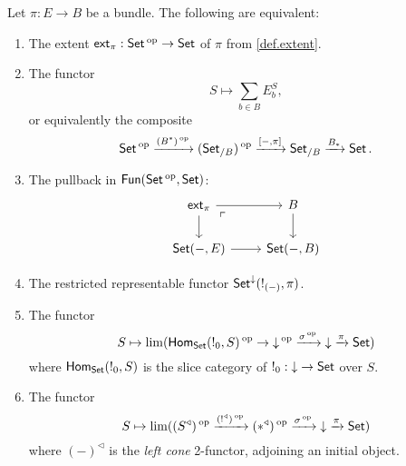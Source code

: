 \begin{prop}\label{prop:set.characterizing.extent}
  Let $\pi : E \to B$ be a bundle. The following are equivalent:
  \begin{enumerate}
  \item The extent $\ext_{\pi} : \Set\op \to \Set$ of $\pi$ from \cref{def.extent}.
  \item The functor
    $$S \mapsto \sum_{b \in B} E_b^S,$$
    or equivalently the composite
  $$\Set\op \xto{(B^{\ast})\op} (\Set_{/B})\op \xto{[-, \pi]} \Set_{/B}
  \xto{B_{\ast}} \Set.$$
\item The pullback in $\Fun(\Set\op, \Set)$:  
\[
\begin{tikzcd}
	\ext_\pi \ar[r]\ar[d]\arrow[dr, phantom,
      "\ulcorner" very near start]&
	B\ar[d]\\
	\Set(-,E)\ar[r]&
	\Set(-,B)
\end{tikzcd}
\]
\item The restricted representable functor
  $\Set^{\down}(!_{(-)}, \pi)$.
\item The functor
  $$S \mapsto \lim(\Hom_{\Set}(!_0, S)\op \to \down\op \xto{\sigma\op} \down \xto{\pi} \Set)$$
  where $\Hom_{\Set}(!_0, S)$ is the slice category of $!_0 : \down \to
  \Set$ over $S$.
\item The functor
  $$S \mapsto \lim(( S^{\triangleleft} )\op \xto{( !^{\triangleleft} )\op}
  (\ast^{\triangleleft})\op \xto{\sigma\op} \down
  \xto{\pi} \Set)$$
  where $(-)^{\triangleleft}$ is the \emph{left cone} 2-functor, adjoining an initial object.
  \end{enumerate}
\end{prop}
